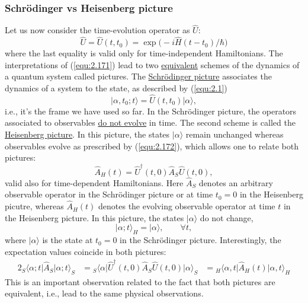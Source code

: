 \subsubsection{Schrödinger vs Heisenberg picture}
Let us now consider the time-evolution operator as
$\hat{U}$:
\begin{equation}
  \hat{U} = \hat{U}(t,t_0) =
  \exp\bigl(-i\hat{H}(t-t_0)/\hbar\bigr)
  \label{equ:2.174}
\end{equation}
where the last equality is valid only for time-independent
Hamiltonians.
The interpretations of (\ref{equ:2.171}) lead to two
\underline{equivalent} schemes of the dynamics of a quantum
system called pictures. The \underline{Schrödinger picture}
associates the dynamics of a system to the state, as
described by (\ref{equ:2.1})
$$
\vert \alpha, t_0 ; t \rangle = \hat{U} (t,t_0) \vert
\alpha \rangle,
$$
i.e., it's the frame we have used so far. In the Schrödinger
picture, the operators associated to observables
\underline{do not evolve} in time.
The second scheme is called the \underline{Heisenberg
picture}. In this picture, the states $\vert \alpha
\rangle$ remain unchanged whereas observables evolve as
prescribed by (\ref{equ:2.172}), which allows one to relate
both pictures:
\begin{equation}
  \hat{A}_{H} (t) = \hat{U}^{\dagger}(t,0) \hat{A}_S
  \hat{U}(t,0),
  \label{equ:2.175}
\end{equation}
valid also for time-dependent Hamiltonians. Here $\hat{A}_S$
denotes an
arbitrary observable operator in the Schrödinger picture or
at time $t_0 = 0$ in the Heisenberg picutre, whereas
$\hat{A}_H(t)$ denotes the evolving observable operator at
time $t$ in the Heisenberg picture. In this picture, the
states $\vert \alpha \rangle$ do not change,
\begin{equation}
  \vert \alpha; t \rangle_H = \vert  \alpha \rangle,
  \qquad \forall t,
  \label{equ:2.176}
\end{equation}
where $\vert \alpha \rangle$ is the state at $t_0 = 0$ in
the Schrödinger picture.
Interestingly, the expectation values coincide in both
pictures:
\begin{alignat}{2}
  {}_S\langle \alpha; t \vert \hat{A}_S \vert \alpha; t
  \rangle_S &= {}_S \langle \alpha \vert 
  \hat{U}^{\dagger}(t,0) \hat{A}_S \hat{U}(t,0) \vert
  \alpha \rangle_S \nonumber
  &= {}_H \langle \alpha, t \vert \hat{A}_H (t) \vert
  \alpha, t \rangle_H \label{equ:2.177}
\end{alignat}
 This is an important observation related to the fact that
 both pictures are equivalent, i.e., lead to the same
 physical observations.

